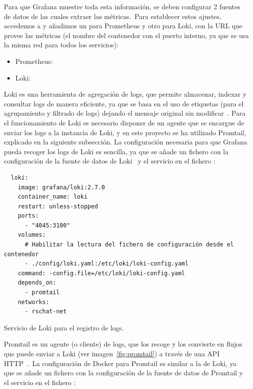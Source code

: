 Para que Grafana muestre toda esta información, se deben configurar 2 fuentes de datos de las cuales extraer las
métricas.\ Para establecer estos ajustes, accedemos a  y añadimos un
 para Prometheus y otro para Loki, con la URL que provee las métricas (el nombre del contenedor con
el puerto interno, ya que se usa la misma red para todos los servicios):

\begin{itemize}
	\item Prometheus: 
	\item Loki: 
\end{itemize}
\label{itm:grafana-data-sources}

Loki es una herramienta de agregación de logs, que permite almacenar, indexar y consultar logs de manera eficiente, ya
que se basa en el uso de etiquetas (para el agrupamiento y filtrado de logs) dejando el mensaje original sin
modificar~\cite{loki-docs}.
Para el funcionamiento de Loki es necesario disponer de un agente que se encargue de enviar los logs a la instancia de
Loki, y en este proyecto se ha utilizado Promtail, explicado en la siguiente subsección.
La configuración necesaria para que Grafana pueda recoger los logs de Loki es sencilla, ya que se añade un fichero
 con la configuración de la fuente de datos de Loki~\cite{loki-config-file} y el servicio en el
fichero :

\begin{codeBlock}
	\begin{verbatim}
  loki:
    image: grafana/loki:2.7.0
    container_name: loki
    restart: unless-stopped
    ports:
      - "4045:3100"
    volumes:
      # Habilitar la lectura del fichero de configuración desde el contenedor
      - ./config/loki.yaml:/etc/loki/loki-config.yaml
    command: -config.file=/etc/loki/loki-config.yaml
    depends_on:
      - promtail
    networks:
      - rschat-net
	\end{verbatim}
	\caption{Servicio de Loki para el registro de logs.}
	\label{cod:loki-docker-compose}
\end{codeBlock}

Promtail es un agente (o cliente) de logs, que los recoge y los convierte en flujos que puede enviar a Loki (ver
imagen~\ref{fig:promtail}) a través de una API HTTP~\cite{loki-docs}.\ La configuración de Docker para Promtail es
similar a la de
Loki, ya que se añade un fichero  con la configuración de la fuente de datos de Promtail y el servicio
en el fichero :

